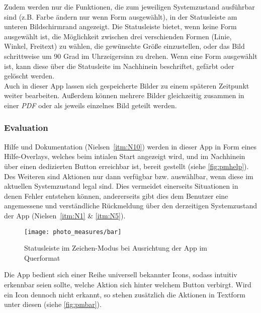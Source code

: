 Zudem werden nur die Funktionen, die zum jeweiligen Systemzustand ausführbar sind (z.B. Farbe ändern nur wenn Form ausgewählt), in der Statusleiste am unteren Bildschirmrand angezeigt.
Die Statusleiste bietet, wenn keine Form ausgewählt ist, die Möglichkeit zwischen drei verschienden Formen (Linie, Winkel, Freitext) zu wählen, die gewünschte Größe einzustellen, oder das Bild schrittweise um 90 Grad im Uhrzeigersinn zu drehen.
Wenn eine Form ausgewählt ist, kann diese über die Statusleite im Nachhinein beschriftet, gefärbt oder gelöscht werden. \\

Auch in dieser App lassen sich gespeicherte Bilder zu einem späteren Zeitpunkt weiter bearbeiten.
Außerdem können mehrere Bilder gleichzeitig zusammen in einer \emph{PDF} oder als jeweils einzelnes Bild geteilt werden.

\subsubsection{Evaluation}

Hilfe und Dokumentation (Nielsen~\autoref{itm:N10}) werden in dieser App in Form eines Hilfe-Overlays, welches beim intialen Start angezeigt wird, und im Nachhinein über einen dedizierten Button erreichbar ist, bereit gestellt (siehe \autoref{fig:pmhelp}). \\

Des Weiteren sind Aktionen nur dann verfügbar bzw. auswählbar, wenn diese im aktuellen Systemzustand legal sind.
Dies vermeidet einerseits Situationen in denen Fehler entstehen können, andererseits gibt dies dem Benutzer eine angemessene und verständliche Rückmeldung über den derzeitigen Systemzustand der App (Nielsen~\autoref{itm:N1} \& \autoref{itm:N5}). \\

\begin{wrapfigure}{R}{0.4\textwidth}
  \centering
  \texttt{[image: photo\_measures/bar]}
  \caption{Statusleiste im Zeichen-Modus bei Ausrichtung der App im Querformat}
  \label{fig:pmbar}
\end{wrapfigure}

\noindent
Die App bedient sich einer Reihe universell bekannter Icons, sodass intuitiv erkennbar seien sollte, welche Aktion sich hinter welchem Button verbirgt.
Wird ein Icon dennoch nicht erkannt, so stehen zusätzlich die Aktionen in Textform unter diesen (siehe \autoref{fig:pmbar}). \\

